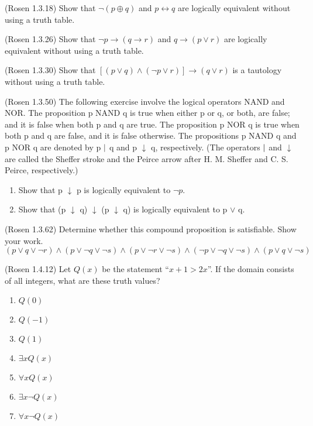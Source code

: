 \documentclass[10pt]{exam}
\begin{document}
\begin{questions}
\question[6] (Rosen 1.3.18) Show that $\neg (p \oplus q)$ and $p \leftrightarrow q$ are logically equivalent
without using a truth table.



\question[6] (Rosen 1.3.26) Show that $\neg p \rightarrow (q \rightarrow r)$ and $q \rightarrow (p \vee r)$ 
are logically equivalent without using a truth table.

\question[6] (Rosen 1.3.30) Show that $[(p \vee q) \wedge (\neg p \vee r)] \rightarrow (q \vee r)$ is a 
tautology without using a truth table.

\question[4] (Rosen 1.3.50) The following exercise involve the logical operators NAND and NOR. The proposition p NAND q is true when either p or q, or both, are false; and it is false when both p and q are true. The proposition p NOR q is true when both p and q are false, and it is false otherwise. The propositions p NAND q and p NOR q are denoted by p $\arrowvert$ q and p $\downarrow$ q, respectively. (The operators $\arrowvert$ and $\downarrow$ are called the Sheffer stroke and the Peirce arrow after H. M. Sheffer and C. S. Peirce, respectively.)

\begin{enumerate} [label=(\alph*)]
  \item Show that p $\downarrow$ p is logically equivalent to $\neg p$.
  \item Show that (p $\downarrow$ q) $\downarrow$ (p $\downarrow$ q) is logically equivalent to p $\lor$ q.
\end{enumerate}

\question[3] (Rosen 1.3.62) Determine whether this compound proposition is satisfiable. Show your work.
\newline $(p \lor q \lor \neg r) \land (p \lor \neg q \lor \neg s) \land (p \lor \neg r \lor \neg s) \land (\neg p \lor \neg q \lor \neg s) \land (p \lor q \lor \neg s)$

\question[6] (Rosen 1.4.12) Let $Q(x)$ be the statement ``$x + 1 > 2x$''.  If the domain consists 
of all integers, what are these truth values?
\begin{enumerate} [label=(\alph*)]
  \item $Q(0)$
  \item $Q(-1)$
  \item $Q(1)$
  \item $\exists x Q(x)$
  \item $\forall x Q(x)$
  \item $\exists x \neg Q(x)$
  \item $\forall x \neg Q(x)$
\end{enumerate}


\end{questions}
\end{document}
